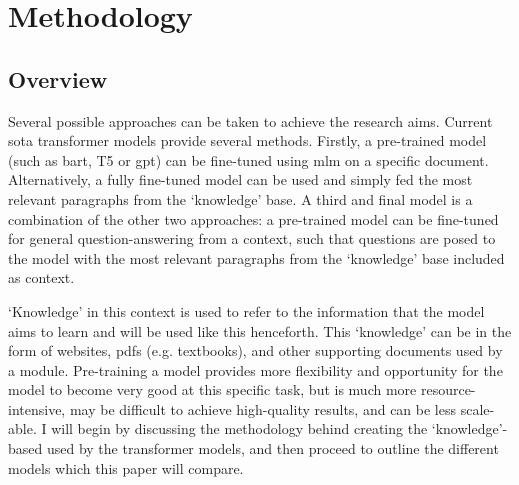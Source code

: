 \chapter{Methodology}

\section{Overview}
Several possible approaches can be taken to achieve the research aims. Current \acrshort{sota} transformer models provide several methods. Firstly, a pre-trained model (such as \acrshort{bart}, T5 or \acrshort{gpt}) can be fine-tuned using \acrfull{mlm} on a specific document. Alternatively, a fully fine-tuned model can be used and simply fed the most relevant paragraphs from the `knowledge' base. A third and final model is a combination of the other two approaches: a pre-trained model can be fine-tuned for general question-answering from a context, such that questions are posed to the model with the most relevant paragraphs from the `knowledge' base included as context.

`Knowledge' in this context is used to refer to the information that the model aims to learn and will be used like this henceforth. This `knowledge' can be in the form of websites, \acrshort{pdf}s (e.g. textbooks), and other supporting documents used by a module. Pre-training a model provides more flexibility and opportunity for the model to become very good at this specific task, but is much more resource-intensive, may be difficult to achieve high-quality results, and can be less scale-able. I will begin by discussing the methodology behind creating the `knowledge'-based used by the transformer models, and then proceed to outline the different models which this paper will compare.


